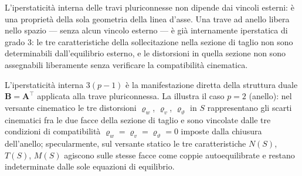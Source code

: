 \begin{oss}
	L'iperstaticità interna delle travi pluriconnesse
	non dipende dai vincoli esterni: è una proprietà
	della sola geometria della linea d'asse. Una
	trave ad anello libera nello spazio --- senza
	alcun vincolo esterno --- è già internamente
	iperstatica di grado $3$: le tre caratteristiche
	della sollecitazione nella sezione di taglio
	non sono determinabili dall'equilibrio esterno,
	e le distorsioni in quella sezione non sono
	assegnabili liberamente senza verificare la
	compatibilità cinematica.
\end{oss}

\begin{oss}
	L'iperstaticità interna $3(p-1)$ è la manifestazione
	diretta della struttura duale $\bm{B} = \bm{A}^{\top}$
	applicata alla trave pluriconnessa. La
	 illustra il caso
	$p = 2$ (anello): nel versante cinematico le tre
	distorsioni $\varrho_w$, $\varrho_v$,
	$\varrho_\vartheta$ in $S$ rappresentano gli scarti
	cinematici fra le due facce della sezione di taglio
	e sono vincolate dalle tre condizioni di compatibilità
	$\varrho_w = \varrho_v = \varrho_\vartheta = 0$
	imposte dalla chiusura dell'anello; specularmente,
	sul versante statico le tre caratteristiche $N(S)$,
	$T(S)$, $M(S)$ agiscono sulle stesse facce come
	coppie autoequilibrate e restano indeterminate dalle
	sole equazioni di equilibrio.
	
	\begin{figure}[!htbp]
		\centering
\end{figure}
\end{oss}
